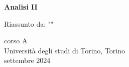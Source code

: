 \begin{titlepage}
   \begin{center}
       \vspace*{1cm}
        
       \textbf{\LARGE Analisi II}

       \vspace{0.5cm}
        Riassunto da: ""


       \vfill
            
       
            
       \vspace{0.8cm}
     
       
            
       corso A\\
       Università degli studi di Torino, Torino\\
       settembre 2024\\
       
            
   \end{center}
\end{titlepage}
